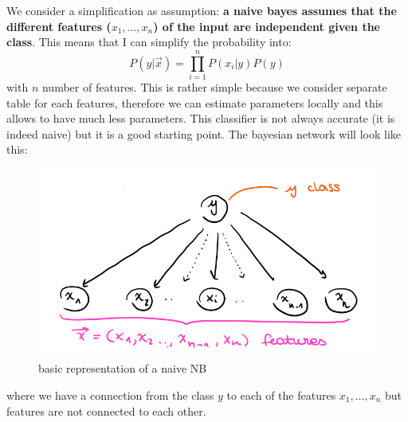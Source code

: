 We consider a simplification as assumption: \textbf{a naive bayes assumes that the different features ($x_1, \dots, x_n$) of the input are independent given the class}. This means that I can simplify the probability into: 
$$P(y|\Vec{x}) = \prod_{i=1}^n P(x_i|y)P(y)$$
with $n$ number of features. 
This is rather simple because we consider separate table for each features, therefore we can estimate parameters locally and this allows to have much less parameters. This classifier is not always accurate (it is indeed naive) but it is a good starting point.
The bayesian network will look like this: \\
\begin{figure}[ht]
    \centering
    \includegraphics[scale=0.4]{images/naiive.png}
    \caption{basic representation of a naive NB}
    \label{fig:naive}
\end{figure}
where we have a connection from the class $y$ to each of the features $x_1, \dots, x_n$ but features are not connected to each other.

